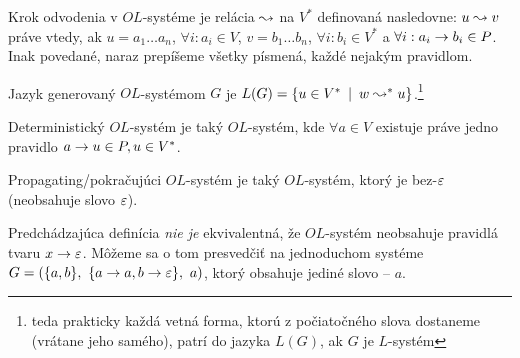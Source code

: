\begin{definicia}
    Krok odvodenia v $OL$-systéme je relácia $\leadsto$ na $V^{*}$ definovaná
    nasledovne: $u\leadsto v$ práve vtedy, ak $u=a_{1} \dots a_{n}$,
    $\forall i: a_{i} \in V$, $v=b_{1} \dots b_{n}$, 
    $\forall i: b_{i} \in V^{*}$ a 
    $\forall i: a_{i} \rightarrow b_{i} \in P$. 
    Inak povedané, naraz prepíšeme všetky písmená, každé nejakým
    pravidlom.
\end{definicia}

\begin{definicia}
    Jazyk generovaný $OL$-systémom $G$ je 
    $L(G)=\{u\in V^{*} \enspace |\enspace w \leadsto^{*} u\}$.\footnote{teda prakticky
        každá vetná forma, ktorú z
        počiatočného slova dostaneme (vrátane jeho samého), patrí do
        jazyka $L(G)$, ak $G$ je $L$-systém
        }
\end{definicia}

\begin{definicia}
    Deterministický $OL$-systém je taký $OL$-systém,
    kde $\forall a\in V$ existuje práve jedno pravidlo
    $a \rightarrow u\in P, u\in V^*$.
\end{definicia}

\begin{definicia}
    Propagating/pokračujúci $OL$-systém je taký $OL$-systém, ktorý
    je bez-$\varepsilon$ (neobsahuje slovo $\varepsilon$).
\end{definicia}

\begin{poznamka}
    Predchádzajúca definícia \emph{nie je} ekvivalentná, že
    $OL$-systém neobsahuje pravidlá tvaru $x \rightarrow \varepsilon$.
    Môžeme sa o tom presvedčiť na jednoduchom systéme
    $G=(\{a,b\},\ \{a \pravidlo a, b \pravidlo \eps\},\ a)$, ktorý
    obsahuje jediné slovo -- $a$.
\end{poznamka}

